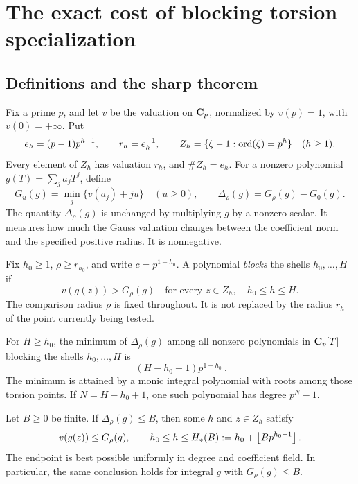 \section{The exact cost of blocking torsion specialization}
\label{sec:torsion}

\subsection{Definitions and the sharp theorem}
Fix a prime \(p\), and let \(v\) be the valuation on \(\mathbf C_p\), normalized by \(v(p)=1\), with \(v(0)=+\infty\). Put
\[
 e_h=(p-1)p^{h-1},\qquad r_h=e_h^{-1},\qquad
 Z_h=\{\zeta-1:\operatorname{ord}(\zeta)=p^h\}\quad(h\ge1).
\]
Every element of \(Z_h\) has valuation \(r_h\), and \(\#Z_h=e_h\).
For a nonzero polynomial \(g(T)=\sum_j a_jT^j\), define
\[
 G_u(g)=\min_j\{v(a_j)+ju\}\quad(u\ge0),\qquad
 \Delta_\rho(g)=G_\rho(g)-G_0(g).
\]
The quantity \(\Delta_\rho(g)\) is unchanged by multiplying \(g\) by a nonzero scalar. It measures how much the Gauss valuation changes between the coefficient norm and the specified positive radius. It is nonnegative.

Fix \(h_0\ge1\), \(\rho\ge r_{h_0}\), and write \(c=p^{1-h_0}\).
A polynomial \emph{blocks} the shells \(h_0,\ldots,H\) if
\[
 v(g(z))>G_\rho(g)
 \quad\text{for every }z\in Z_h,\quad h_0\le h\le H.
\]
The comparison radius \(\rho\) is fixed throughout. It is not replaced by the radius \(r_h\) of the point currently being tested.

\begin{theorem}
\label{thm:obstruction}
For \(H\ge h_0\), the minimum of \(\Delta_\rho(g)\) among all nonzero polynomials in \(\mathbf C_p[T]\) blocking the shells \(h_0,\ldots,H\) is
\[
 \boxed{\ (H-h_0+1)p^{1-h_0}\ }.
\]
The minimum is attained by a monic integral polynomial with roots among those torsion points. If \(N=H-h_0+1\), one such polynomial has degree \(p^N-1\).
\end{theorem}

\begin{corollary}
\label{cor:endpoint}
Let \(B\ge0\) be finite. If \(\Delta_\rho(g)\le B\), then some \(h\) and \(z\in Z_h\) satisfy
\[
 v(g(z))\le G_\rho(g),\qquad
 h_0\le h\le H_*(B):=h_0+\left\lfloor Bp^{h_0-1}\right\rfloor.
\]
The endpoint is best possible uniformly in degree and coefficient field. In particular, the same conclusion holds for integral \(g\) with \(G_\rho(g)\le B\).
\end{corollary}

